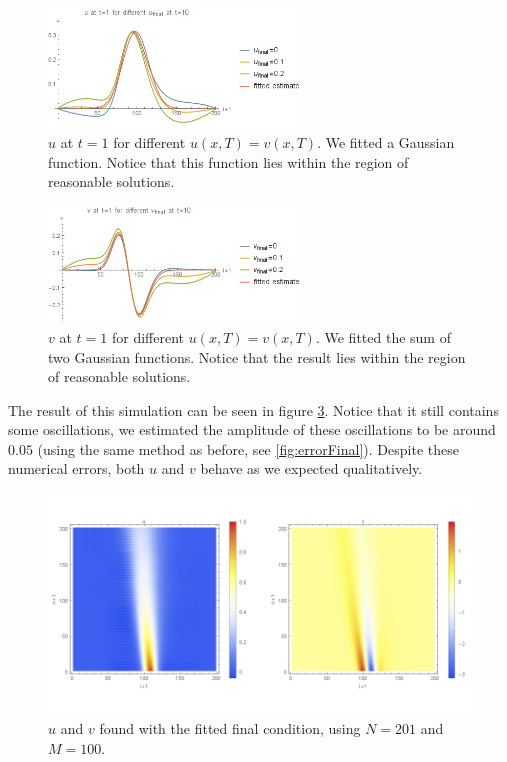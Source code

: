 \documentclass{article}
\renewcommand{\(}{\left(}
\renewcommand{\)}{\right)}
\begin{document}
\begin{figure}
\centering
\includegraphics[width=0.6\textwidth]{uFinals.png}
\caption{$u$ at $t=1$ for different $u(x, T) = v(x, T)$. We fitted a Gaussian function. Notice that this function lies within the region of reasonable solutions.}
\label{fig:uFinals}
\end{figure}

\begin{figure}
\centering
\includegraphics[width=0.6\textwidth]{vFinals.png}
\caption{$v$ at $t=1$ for different $u(x, T) = v(x, T)$. We fitted the sum of two Gaussian functions. Notice that the result lies within the region of reasonable solutions.}
\label{fig:vFinals}
\end{figure}

The result of this simulation can be seen in figure \ref{fig:uvResult}. Notice that it still contains some oscillations, we estimated the amplitude of these oscillations to be around $0.05$ (using the same method as before, see \ref{fig:errorFinal}). Despite these numerical errors, both $u$ and $v$ behave as we expected qualitatively.

\begin{figure}
\centering
\includegraphics[width=1.0\textwidth]{uvResult.png}
\caption{$u$ and $v$ found with the fitted final condition, using $N=201$ and $M=100$.}
\label{fig:uvResult}
\end{figure}
\end{document}
